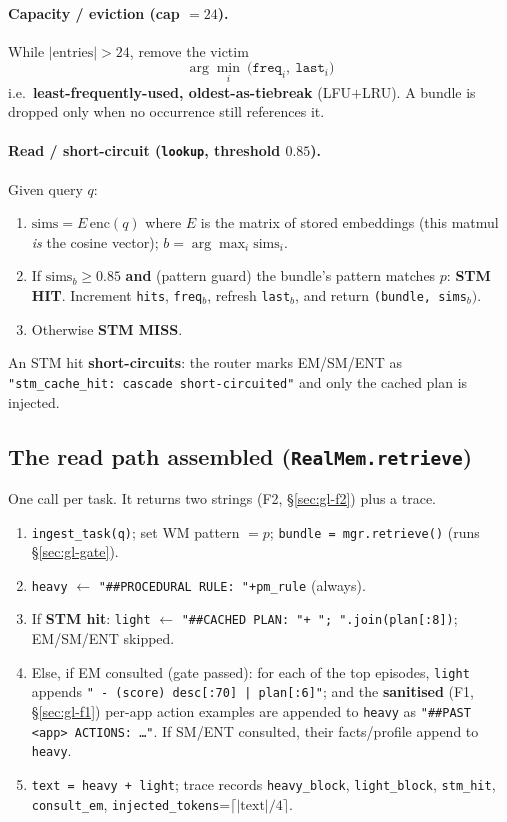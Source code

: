 \paragraph{Capacity / eviction (cap $=24$).} While $|\text{entries}|>24$, remove the victim
\[
\arg\min_i\ \big(\texttt{freq}_i,\ \texttt{last}_i\big)
\]
i.e.\ \textbf{least-frequently-used, oldest-as-tiebreak} (LFU$+$LRU). A bundle is dropped only when no
occurrence still references it.

\paragraph{Read / short-circuit (\texttt{lookup}, threshold $0.85$).} Given query $q$:
\begin{enumerate}\itemsep1pt
\item $\text{sims} = E\,\mathrm{enc}(q)$ where $E$ is the matrix of stored embeddings (this matmul
\emph{is} the cosine vector); $b=\arg\max_i \text{sims}_i$.
\item If $\text{sims}_b \ge 0.85$ \textbf{and} (pattern guard) the bundle's pattern matches $p$:
\textbf{STM HIT}. Increment \texttt{hits}, \texttt{freq}$_b$, refresh \texttt{last}$_b$, and return
\texttt{(bundle, sims}$_b)$.
\item Otherwise \textbf{STM MISS}.
\end{enumerate}
An STM hit \textbf{short-circuits}: the router marks EM/SM/ENT as
\texttt{"stm\_cache\_hit: cascade short-circuited"} and only the cached plan is injected.

\subsection{The read path assembled (\texttt{RealMem.retrieve})}
\label{sec:gl-retrieve}
One call per task. It returns two strings (F2, \S\ref{sec:gl-f2}) plus a trace.
\begin{enumerate}\itemsep1pt
\item \texttt{ingest\_task(q)}; set WM pattern $=p$; \texttt{bundle = mgr.retrieve()} (runs
\S\ref{sec:gl-gate}).
\item \texttt{heavy} $\gets$ \texttt{"\#\#PROCEDURAL RULE: "+pm\_rule} (always).
\item If \textbf{STM hit}: \texttt{light} $\gets$ \texttt{"\#\#CACHED PLAN: "+ "; ".join(plan[:8])};
EM/SM/ENT skipped.
\item Else, if EM consulted (gate passed): for each of the top episodes,
\texttt{light} appends \texttt{" - (score) desc[:70] | plan[:6]"}; and the \textbf{sanitised}
(F1, \S\ref{sec:gl-f1}) per-app action examples are appended to \texttt{heavy} as
\texttt{"\#\#PAST <app> ACTIONS: \dots"}. If SM/ENT consulted, their facts/profile append to
\texttt{heavy}.
\item \texttt{text = heavy + light}; trace records \texttt{heavy\_block}, \texttt{light\_block},
\texttt{stm\_hit}, \texttt{consult\_em}, \texttt{injected\_tokens}=$\lceil|\text{text}|/4\rceil$.
\end{enumerate}

